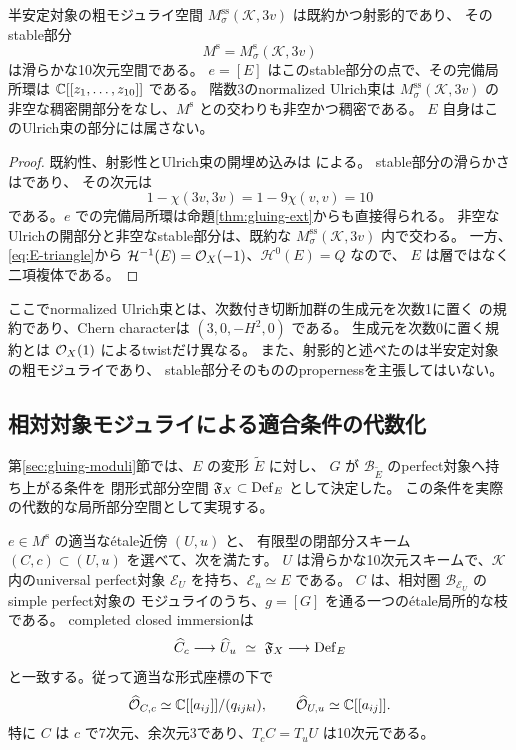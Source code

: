\begin{theorem}[安定対象モジュライでの位置づけ]\label{thm:stable-ambient}
半安定対象の粗モジュライ空間
$M^{\mathrm{ss}}_\sigma(\mathcal K,3v)$ は既約かつ射影的であり、
そのstable部分
\[
 M^{\mathrm s}=M^{\mathrm s}_\sigma(\mathcal K,3v)
\]
は滑らかな10次元空間である。
$e=[E]$ はこのstable部分の点で、その完備局所環は
$\mathbb C[[z_1,\ldots,z_{10}]]$ である。
階数3のnormalized Ulrich束は $M^{\mathrm{ss}}_\sigma(\mathcal K,3v)$ の
非空な稠密開部分をなし、$M^{\mathrm s}$ との交わりも非空かつ稠密である。
$E$ 自身はこのUlrich束の部分には属さない。
\end{theorem}

\begin{proof}
既約性、射影性とUlrich束の開埋め込みは
\cite[Section 6, Corollary 6.5]{FP}による。
stable部分の滑らかさは\cite[Theorem 1.2]{PY}であり、
その次元は
\[
 1-\chi(3v,3v)=1-9\chi(v,v)=10
\]
である。$e$ での完備局所環は命題\ref{thm:gluing-ext}からも直接得られる。
非空なUlrichの開部分と非空なstable部分は、既約な
$M^{\mathrm{ss}}_\sigma(\mathcal K,3v)$ 内で交わる。
一方、\eqref{eq:E-triangle}から
$\mathcal H^{-1}(E)=\mathcal O_X(-1)$、$\mathcal H^0(E)=Q$ なので、
$E$ は層ではなく二項複体である。
\end{proof}

ここでnormalized Ulrich束とは、次数付き切断加群の生成元を次数1に置く
\cite{FP}の規約であり、Chern characterは $(3,0,-H^2,0)$ である。
生成元を次数0に置く規約とは $\mathcal O_X(1)$ によるtwistだけ異なる。
また、射影的と述べたのは半安定対象の粗モジュライであり、
stable部分そのもののpropernessを主張してはいない。

\subsection{相対対象モジュライによる適合条件の代数化}

第\ref{sec:gluing-moduli}節では、$E$ の変形 $\widetilde E$ に対し、
$G$ が $\mathcal B_{\widetilde E}$ のperfect対象へ持ち上がる条件を
閉形式部分空間 $\mathfrak F_X\subset\operatorname{Def}_E$ として決定した。
この条件を実際の代数的な局所部分空間として実現する。

\begin{theorem}[代数的な適合部分空間]\label{thm:algebraic-compatibility}
$e\in M^{\mathrm s}$ の適当な\'etale近傍 $(U,u)$ と、
有限型の閉部分スキーム $(C,c)\subset(U,u)$ を選べて、次を満たす。
$U$ は滑らかな10次元スキームで、$\mathcal K$ 内のuniversal perfect対象
$\mathcal E_U$ を持ち、$\mathcal E_u\simeq E$ である。
$C$ は、相対圏 $\mathcal B_{\mathcal E_U}$ のsimple perfect対象の
モジュライのうち、$g=[G]$ を通る一つの\'etale局所的な枝である。
completed closed immersionは
\[
 \widehat C_c\longrightarrow\widehat U_u
 \ \simeq\
 \mathfrak F_X\longrightarrow\operatorname{Def}_E
\]
と一致する。従って適当な形式座標の下で
\[
 \widehat{\mathcal O}_{C,c}
  \simeq\mathbb C[[a_{ij}]]/(q_{ijkl}),\qquad
 \widehat{\mathcal O}_{U,u}\simeq\mathbb C[[a_{ij}]].
\]
特に $C$ は $c$ で7次元、余次元3であり、$T_cC=T_uU$ は10次元である。
\end{theorem}

